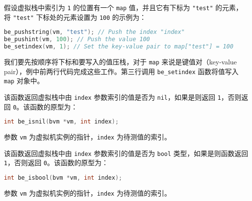 假设虚拟栈中索引为 \texttt{1} 的位置有一个 \texttt{map} 值，并且它有下标为 \texttt{"test"} 的元素，将 \texttt{"test"} 下标处的元素设置为 \texttt{100} 的示例为：
\begin{lstlisting}[language=c, style=berry]
be_pushstring(vm, "test"); // Push the index "index"
be_pushint(vm, 100); // Push the value 100
be_setindex(vm, 1); // Set the key-value pair to map["test"] = 100
\end{lstlisting}
我们要先按顺序将下标和要写入的值压栈，对于 \texttt{map} 来说是键值对（key-value pair），例中前两行代码完成这些工作。第三行调用 \texttt{be\_setindex} 函数将值写入 \texttt{map} 对象中。
















该函数返回虚拟栈中由 \texttt{index} 参数索引的值是否为 \texttt{nil}，如果是则返回 \texttt{1}，否则返回 \texttt{0}。该函数的原型为：
\begin{lstlisting}[language=c, style=berry, numbers=none]
int be_isnil(bvm *vm, int index);
\end{lstlisting}
参数 \texttt{vm} 为虚拟机实例的指针，\texttt{index} 为待测值的索引。


该函数返回虚拟栈中由 \texttt{index} 参数索引的值是否为 \texttt{bool} 类型，如果是则函数返回 \texttt{1}，否则返回 \texttt{0}。该函数的原型为：
\begin{lstlisting}[language=c, style=berry, numbers=none]
int be_isbool(bvm *vm, int index);
\end{lstlisting}
参数 \texttt{vm} 为虚拟机实例的指针，\texttt{index} 为待测值的索引。

